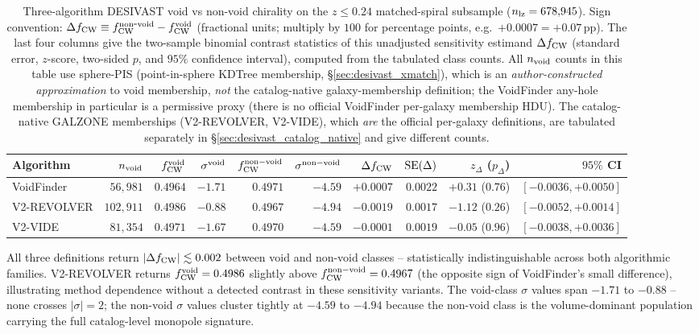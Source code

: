 \documentclass[twocolumn,linenumbers]{aastex702}
\begin{document}
\begin{table}[ht]
\caption{Three-algorithm DESIVAST void vs non-void chirality on the
$z \leq 0.24$ matched-spiral subsample ($n_{\rm lz} = 678{,}945$).
Sign convention: $\Delta f_{\rm CW} \equiv f_{\rm CW}^{\rm non\mbox{-}void}
- f_{\rm CW}^{\rm void}$ (fractional units; multiply by $100$ for
percentage points, e.g.\ $+0.0007 = +0.07$\,pp). The last four columns give the two-sample
binomial contrast statistics of this unadjusted sensitivity estimand
$\Delta f_{\rm CW}$ (standard error, $z$-score, two-sided $p$, and
$95\%$ confidence interval), computed from the tabulated class counts.
All $n_{\rm void}$ counts in this table use sphere-PIS
(point-in-sphere KDTree membership, \S\ref{sec:desivast_xmatch}), which is
an \emph{author-constructed approximation} to void membership, \emph{not}
the catalog-native galaxy-membership definition; the VoidFinder any-hole
membership in particular is a permissive proxy (there is no official
VoidFinder per-galaxy membership HDU). The catalog-native GALZONE
memberships (V2-REVOLVER, V2-VIDE), which \emph{are} the official
per-galaxy definitions, are tabulated separately in
\S\ref{sec:desivast_catalog_native} and give different counts.}
\label{tab:desivast_three_algo}
\begin{ruledtabular}
\begin{tabular}{lrrrrrrrrr}
Algorithm & $n_{\rm void}$ & $f_{\rm CW}^{\rm void}$ &
$\sigma^{\rm void}$ & $f_{\rm CW}^{\rm non-void}$ &
$\sigma^{\rm non-void}$ & $\Delta f_{\rm CW}$ & ${\rm SE}(\Delta)$ &
$z_\Delta$ ($p_\Delta$) & $95\%$ CI \\
\hline
VoidFinder   & $56{,}981$  & $0.4964$ & $-1.71$ & $0.4971$ & $-4.59$ & $+0.0007$ & $0.0022$ & $+0.31$ ($0.76$) & $[-0.0036, +0.0050]$ \\
V2-REVOLVER  & $102{,}911$ & $0.4986$ & $-0.88$ & $0.4967$ & $-4.94$ & $-0.0019$ & $0.0017$ & $-1.12$ ($0.26$) & $[-0.0052, +0.0014]$ \\
V2-VIDE      & $81{,}354$  & $0.4971$ & $-1.67$ & $0.4970$ & $-4.59$ & $-0.0001$ & $0.0019$ & $-0.05$ ($0.96$) & $[-0.0038, +0.0036]$ \\
\end{tabular}
\end{ruledtabular}
\end{table}

All three definitions return $|\Delta f_{\rm CW}| \lesssim 0.002$ between
void and non-void classes -- statistically indistinguishable across both
algorithmic families. V2-REVOLVER returns
$f_{\rm CW}^{\rm void} = 0.4986$ slightly above $f_{\rm CW}^{\rm
non-void} = 0.4967$ (the opposite sign of VoidFinder's small
difference), illustrating method dependence without a detected contrast
in these sensitivity variants. The void-class $\sigma$ values span $-1.71$ to $-0.88$ --
none crosses $|\sigma| = 2$; the non-void $\sigma$ values cluster
tightly at $-4.59$ to $-4.94$ because the non-void class is the
volume-dominant population carrying the full catalog-level monopole
signature.
\end{document}
